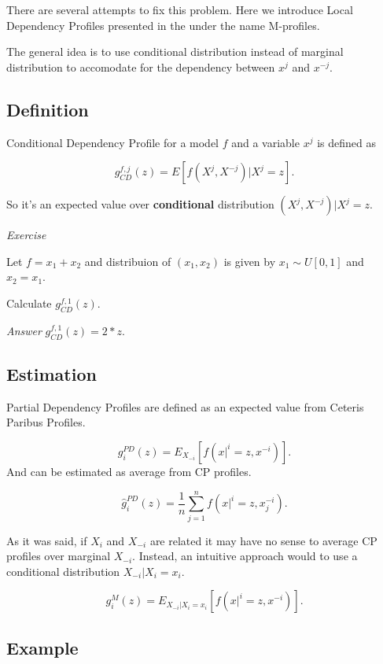 \documentclass[12pt,]{krantz}
\theoremstyle{definition}
\theoremstyle{definition}
\theoremstyle{definition}
\theoremstyle{remark}
\begin{document}
There are several attempts to fix this problem. Here we introduce Local
Dependency Profiles presented in the \citep{R-ALEPlot} under the name
M-profiles.

The general idea is to use conditional distribution instead of marginal
distribution to accomodate for the dependency between \(x^j\) and
\(x^{-j}\).

\hypertarget{definition-1}{%
\subsection{Definition}\label{definition-1}}

Conditional Dependency Profile for a model \(f\) and a variable \(x^j\)
is defined as

\[
g_{CD}^{f, j}(z) = E[f(X^j, X^{-j})|X^j = z].
\]

So it's an expected value over \textbf{conditional} distribution
\((X^j,X^{-j})|X^j=z\).

\emph{Exercise}

Let \(f = x_1 + x_2\) and distribuion of \((x_1, x_2)\) is given by
\(x_1 \sim U[0,1]\) and \(x_2=x_1\).

Calculate \(g_{CD}^{f, 1}(z)\).

\emph{Answer} \(g_{CD}^{f, 1}(z) = 2*z\).

\hypertarget{estimation-1}{%
\subsection{Estimation}\label{estimation-1}}

Partial Dependency Profiles are defined as an expected value from
Ceteris Paribus Profiles.

\[
g^{PD}_i(z) = E_{X_{-i}}[ f(x|^i = z, x^{-i}) ].
\] And can be estimated as average from CP profiles.

\[
\hat g^{PD}_i(z) = \frac{1}{n} \sum_{j=1}^{n} f(x|^i = z, x_j^{-i}).
\]

As it was said, if \(X_i\) and \(X_{-i}\) are related it may have no
sense to average CP profiles over marginal \(X_{-i}\). Instead, an
intuitive approach would to use a conditional distribution
\(X_{-i}|X_i=x_i\).

\[
g^{M}_i(z) = E_{X_{-i}|X_i=x_i}[ f(x|^i = z, x^{-i}) ].
\]

\hypertarget{example}{%
\subsection{Example}\label{example}}
\end{document}
